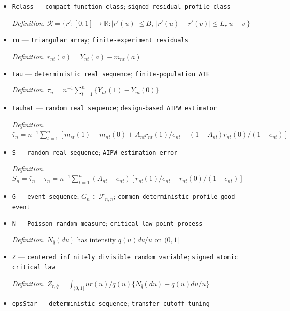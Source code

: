 \documentclass{article}
\begin{document}
\begin{itemize}
  \par\smallskip\noindent\emph{Definition.} \(\mathcal Q=\{q':[0,1]\to\mathbb R:q'(0)=c,\ c/2\le q'(u)\le K,\ |q'(u)-q'(v)|\le L_q|u-v|\}\)
  \item \texttt{Rclass} --- \texttt{compact function class}; \texttt{signed residual profile class}
  \par\smallskip\noindent\emph{Definition.} \(\mathcal R=\{r':[0,1]\to\mathbb R:|r'(u)|\le B,\ |r'(u)-r'(v)|\le L_r|u-v|\}\)
  \item \texttt{rn} --- \texttt{triangular array}; \texttt{finite-\allowbreak{}experiment residuals}
  \par\smallskip\noindent\emph{Definition.} \(r_{nt}(a)=Y_{nt}(a)-m_{nt}(a)\)
  \item \texttt{tau} --- \texttt{deterministic real sequence}; \texttt{finite-\allowbreak{}population ATE}
  \par\smallskip\noindent\emph{Definition.} \(\tau_n=n^{-1}\sum_{t=1}^{n}\{Y_{nt}(1)-Y_{nt}(0)\}\)
  \item \texttt{tauhat} --- \texttt{random real sequence}; \texttt{design-\allowbreak{}based AIPW estimator}
  \par\smallskip\noindent\emph{Definition.} \(\widehat\tau_n=n^{-1}\sum_{t=1}^{n}[m_{nt}(1)-m_{nt}(0)+A_{nt}r_{nt}(1)/e_{nt}-(1-A_{nt})r_{nt}(0)/(1-e_{nt})]\)
  \item \texttt{S} --- \texttt{random real sequence}; \texttt{AIPW estimation error}
  \par\smallskip\noindent\emph{Definition.} \(S_n=\widehat\tau_n-\tau_n=n^{-1}\sum_{t=1}^{n}(A_{nt}-e_{nt})[r_{nt}(1)/e_{nt}+r_{nt}(0)/(1-e_{nt})]\)
  \item \texttt{G} --- \texttt{event sequence}; \(G_n\in\mathcal F_{n,n}\); \texttt{common deterministic-\allowbreak{}profile good event}
  \item \texttt{N} --- \texttt{Poisson random measure}; \texttt{critical-\allowbreak{}law point process}
  \par\smallskip\noindent\emph{Definition.} \(N_{\bar q}(du)\) has intensity \(\bar q(u)du/u\) on \((0,1]\)
  \item \texttt{Z} --- \texttt{centered infinitely divisible random variable}; \texttt{signed atomic critical law}
  \par\smallskip\noindent\emph{Definition.} \(Z_{r,\bar q}=\int_{(0,1]}u r(u)/\bar q(u)\{N_{\bar q}(du)-\bar q(u)du/u\}\)
  \item \texttt{epsStar} --- \texttt{deterministic sequence}; \texttt{transfer cutoff tuning}

\end{itemize}
\end{document}
